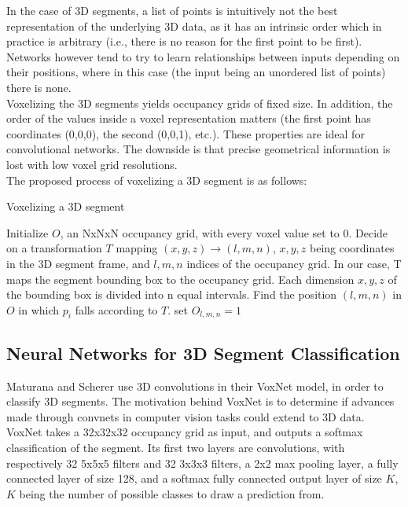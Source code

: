 In the case of 3D segments, a list of points is intuitively not the best representation of the underlying 3D data, as it has an intrinsic order which in practice is arbitrary (i.e., there is no reason for the first point to be first). Networks however tend to try to learn relationships between inputs depending on their positions, where in this case (the input being an unordered list of points) there is none.\\

Voxelizing the 3D segments yields occupancy grids of fixed size. In addition, the order of the values inside a voxel representation matters (the first point has coordinates (0,0,0), the second (0,0,1), etc.). These properties are ideal for convolutional networks. The downside is that precise geometrical information is lost with low voxel grid resolutions.\\

The proposed process of voxelizing a 3D segment is as follows:

\begin{algorithm}
  \caption{Voxelizing a 3D segment}
  \begin{algorithmic}[1]
    \State Initialize $O$, an NxNxN occupancy grid, with every voxel value set to 0.
    \State Decide on a transformation $T$ mapping $(x,y,z) \to (l,m,n)$, $x,y,z$ being coordinates in the 3D segment frame, and $l,m,n$ indices of the occupancy grid. In our case, T maps the segment bounding box to the occupancy grid. Each dimension $x,y,z$ of the bounding box is divided into n equal intervals.
    \State Find the position $(l,m,n)$ in $O$ in which $p_i$ falls according to $T$.
     \State set $O_{l,m,n} = 1$
    \EndIf
    \EndFor
  \end{algorithmic}
\end{algorithm}

\subsection{Neural Networks for 3D Segment Classification}
\label{subsec:voxnet}

Maturana and Scherer \cite{voxnet} use 3D convolutions in their VoxNet model, in order to classify 3D segments. The motivation behind VoxNet is to determine if advances made through convnets in computer vision tasks could extend to 3D data.\\

VoxNet takes a 32x32x32 occupancy grid as input, and outputs a softmax classification of the segment.  
Its first two layers are convolutions, with respectively 32 5x5x5 filters and 32 3x3x3 filters, a 2x2 max pooling layer, a fully connected layer of size 128, and a softmax fully connected output layer of size $K$, $K$ being the number of possible classes to draw a prediction from.\\


